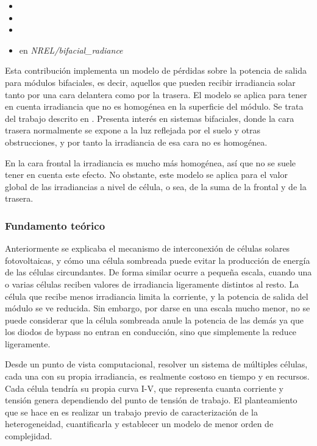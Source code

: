 \begin{itemize}
    \item {}
    \item {}
    \item {}
    \item {} en \textit{NREL/bifacial\_radiance}
\end{itemize}

Esta contribución implementa un modelo de pérdidas sobre la potencia de salida para \gls{módulos bifaciales}, es decir, aquellos que pueden recibir \gls{irradiancia} solar tanto por una cara delantera como por la trasera. El modelo se aplica para tener en cuenta irradiancia que no es homogénea en la superficie del \gls{módulo}. Se trata del trabajo descrito en \cite{Deline_Ayala_Pelaez_MacAlpine_Olalla_2020}.
Presenta interés en sistemas bifaciales, donde la cara trasera normalmente se expone a la luz \gls{reflejada} por el suelo y otras obstrucciones, y por tanto la irradiancia de esa cara no es homogénea.

En la cara frontal la irradiancia es mucho más homogénea, así que no se suele tener en cuenta este efecto. No obstante, este modelo se aplica para el valor global de las irradiancias a nivel de célula, o sea, de la suma de la frontal y de la trasera.

\subsubsection{Fundamento teórico}

Anteriormente se explicaba el mecanismo de interconexión de células solares fotovoltaicas, y cómo una célula sombreada puede evitar la producción de energía de las células circundantes. De forma similar ocurre a pequeña escala, cuando una o varias células reciben valores de irradiancia ligeramente distintos al resto. La célula que recibe menos irradiancia limita la corriente, y la potencia de salida del módulo se ve reducida. Sin embargo, por darse en una escala mucho menor, no se puede considerar que la célula sombreada anule la potencia de las demás ya que los \gls{diodos de bypass} no entran en conducción, sino que simplemente la reduce ligeramente.

Desde un punto de vista computacional, resolver un sistema de múltiples células, cada una con su propia irradiancia, es realmente costoso en tiempo y en recursos. Cada célula tendría su propia curva I-V, que representa cuanta corriente y tensión genera dependiendo del punto de tensión de trabajo. El planteamiento que se hace en \cite{Deline_Ayala_Pelaez_MacAlpine_Olalla_2020} es realizar un trabajo previo de caracterización de la heterogeneidad, cuantificarla y establecer un modelo de menor orden de complejidad.

